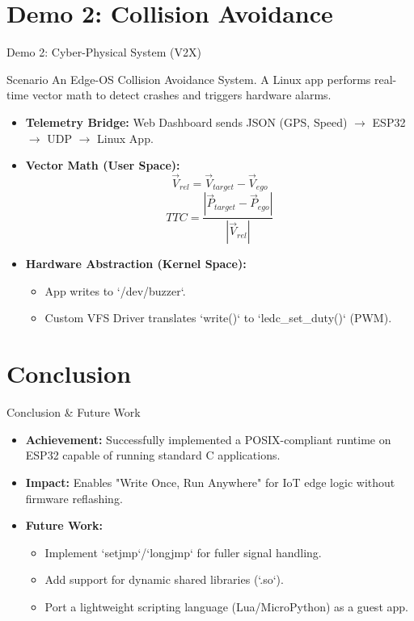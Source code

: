 \documentclass{beamer}
\begin{document}
\section{Demo 2: Collision Avoidance}
\begin{frame}{Demo 2: Cyber-Physical System (V2X)}
    \begin{block}{Scenario}
        An Edge-OS Collision Avoidance System. A Linux app performs real-time vector math to detect crashes and triggers hardware alarms.
    \end{block}

    \begin{itemize}
        \item \textbf{Telemetry Bridge:} Web Dashboard sends JSON (GPS, Speed) $\rightarrow$ ESP32 $\rightarrow$ UDP $\rightarrow$ Linux App.
        \item \textbf{Vector Math (User Space):}
        $$ \vec{V}_{rel} = \vec{V}_{target} - \vec{V}_{ego} $$
        $$ TTC = \frac{|\vec{P}_{target} - \vec{P}_{ego}|}{|\vec{V}_{rel}|} $$
        \item \textbf{Hardware Abstraction (Kernel Space):}
        \begin{itemize}
            \item App writes to `/dev/buzzer`.
            \item Custom VFS Driver translates `write()` to `ledc_set_duty()` (PWM).
        \end{itemize}
    \end{itemize}
\end{frame}

\section{Conclusion}
\begin{frame}{Conclusion & Future Work}
    \begin{itemize}
        \item \textbf{Achievement:} Successfully implemented a POSIX-compliant runtime on ESP32 capable of running standard C applications.
        \item \textbf{Impact:} Enables "Write Once, Run Anywhere" for IoT edge logic without firmware reflashing.
        \item \textbf{Future Work:}
        \begin{itemize}
            \item Implement `setjmp`/`longjmp` for fuller signal handling.
            \item Add support for dynamic shared libraries (`.so`).
            \item Port a lightweight scripting language (Lua/MicroPython) as a guest app.
        \end{itemize}
    \end{itemize}
\end{frame}
\end{document}
